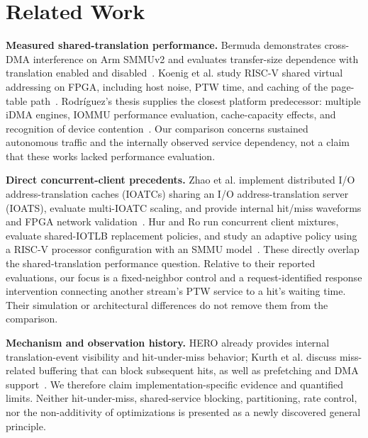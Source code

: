 \section{Related Work}
\textbf{Measured shared-translation performance.} Bermuda demonstrates cross-DMA interference on Arm SMMUv2 and evaluates transfer-size dependence with translation enabled and disabled~\cite{bermuda2025}. Koenig et al. study RISC-V shared virtual addressing on FPGA, including host noise, PTW time, and caching of the page-table path~\cite{koenig2025}. Rodr\'{i}guez's thesis supplies the closest platform predecessor: multiple iDMA engines, IOMMU performance evaluation, cache-capacity effects, and recognition of device contention~\cite{rodriguez2024}. Our comparison concerns sustained autonomous traffic and the internally observed service dependency, not a claim that these works lacked performance evaluation.

\textbf{Direct concurrent-client precedents.} Zhao et al. implement distributed I/O address-translation caches (IOATCs) sharing an I/O address-translation server (IOATS), evaluate multi-IOATC scaling, and provide internal hit/miss waveforms and FPGA network validation~\cite{zhao2025}. Hur and Ro run concurrent client mixtures, evaluate shared-IOTLB replacement policies, and study an adaptive policy using a RISC-V processor configuration with an SMMU model~\cite{hur2025}. These directly overlap the shared-translation performance question. Relative to their reported evaluations, our focus is a fixed-neighbor control and a request-identified response intervention connecting another stream's PTW service to a hit's waiting time. Their simulation or architectural differences do not remove them from the comparison.

\textbf{Mechanism and observation history.} HERO already provides internal translation-event visibility and hit-under-miss behavior; Kurth et al. discuss miss-related buffering that can block subsequent hits, as well as prefetching and DMA support~\cite{hero2017,kurth2018}. We therefore claim implementation-specific evidence and quantified limits. Neither hit-under-miss, shared-service blocking, partitioning, rate control, nor the non-additivity of optimizations is presented as a newly discovered general principle.
